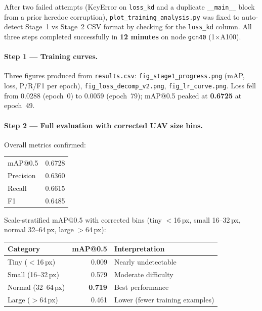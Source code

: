 After two failed attempts (KeyError on \texttt{loss\_kd} and a duplicate
\texttt{\_\_main\_\_} block from a prior heredoc corruption),
\texttt{plot\_training\_analysis.py} was fixed to auto-detect Stage~1
vs Stage~2 CSV format by checking for the \texttt{loss\_kd} column.
All three steps completed successfully in \textbf{12 minutes}
on node \texttt{gcn40} (1$\times$A100).

\paragraph{Step 1 — Training curves.}
Three figures produced from \texttt{results.csv}:
\texttt{fig\_stage1\_progress.png} (mAP, loss, P/R/F1 per epoch),
\texttt{fig\_loss\_decomp\_v2.png}, \texttt{fig\_lr\_curve.png}.
Loss fell from 0.0288 (epoch~0) to 0.0059 (epoch~79);
mAP@0.5 peaked at \textbf{0.6725} at epoch~49.

\paragraph{Step 2 — Full evaluation with corrected UAV size bins.}
Overall metrics confirmed:

\begin{center}\small
\begin{tabular}{ll}
\hline
mAP@0.5    & 0.6728 \\
Precision  & 0.6360 \\
Recall     & 0.6615 \\
F1         & 0.6485 \\
\hline
\end{tabular}
\end{center}

\noindent Scale-stratified mAP@0.5 with corrected bins
(tiny $<$16\,px, small 16--32\,px, normal 32--64\,px, large $>$64\,px):

\begin{center}\small
\begin{tabular}{lrl}
\hline
\textbf{Category} & \textbf{mAP@0.5} & \textbf{Interpretation} \\
\hline
Tiny ($<$16\,px)    & 0.009 & Nearly undetectable \\
Small (16--32\,px)  & 0.579 & Moderate difficulty \\
Normal (32--64\,px) & \textbf{0.719} & Best performance \\
Large ($>$64\,px)   & 0.461 & Lower (fewer training examples) \\
\hline
\end{tabular}
\end{center}

